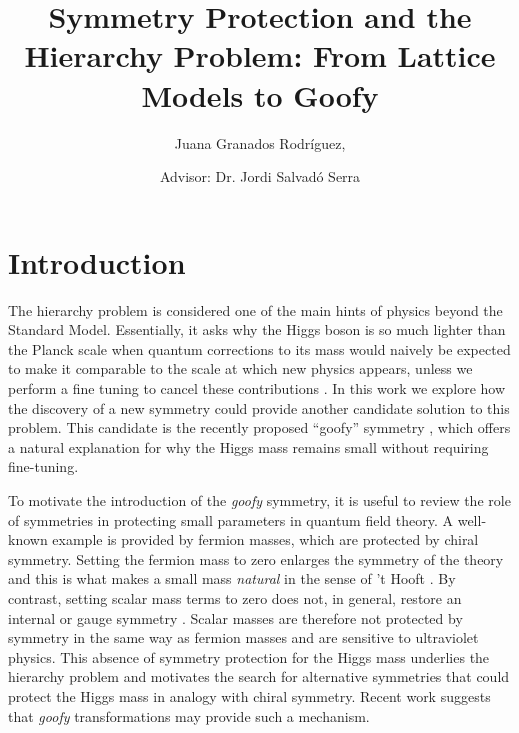 \documentclass[a4paper, 11pt]{article}
\title{\boldmath Symmetry Protection and the Hierarchy Problem: From Lattice Models to Goofy}
\author{Juana Granados Rodríguez,}
\affiliation{Facultat de F\'{\i}sica, Universitat de Barcelona, Martí i Franquès 1, 08028 Barcelona, Spain.}
\author{Advisor: Dr. Jordi Salvadó Serra}
\begin{document}
\maketitle
\section{Introduction}
\label{sec:intro}

The hierarchy problem is considered one of the main hints of physics beyond the Standard Model. Essentially, it asks why the Higgs boson is so much lighter than the Planck scale when quantum corrections to its mass would naively be expected to make it comparable to the scale at which new physics appears, unless we perform a fine tuning to cancel these contributions \cite{PeskinHierarchy}. In this work we explore how the discovery of a new symmetry could provide another candidate solution to this problem. This candidate is the recently proposed ``goofy'' symmetry \cite{2HDM, Trautner_goofy1, goofy2}, which offers a natural explanation for why the Higgs mass remains small without requiring fine-tuning.

To motivate the introduction of the \textit{goofy} symmetry, it is useful to review the role of symmetries in protecting small parameters in quantum field theory. A well-known example is provided by fermion masses, which are protected by chiral symmetry. Setting the fermion mass to zero enlarges the symmetry of the theory and this is what makes a small mass \emph{natural} in the sense of 't Hooft \cite{CraigNaturalness}. By contrast, setting scalar mass terms to zero does not, in general, restore an internal or gauge symmetry \cite{wilson}. Scalar masses are therefore not protected by symmetry in the same way as fermion masses and are sensitive to ultraviolet physics. This absence of symmetry protection for the Higgs mass underlies the hierarchy problem and motivates the search for alternative symmetries that could protect the Higgs mass in analogy with chiral symmetry. Recent work suggests that \textit{goofy} transformations may provide such a mechanism.
\end{document}
